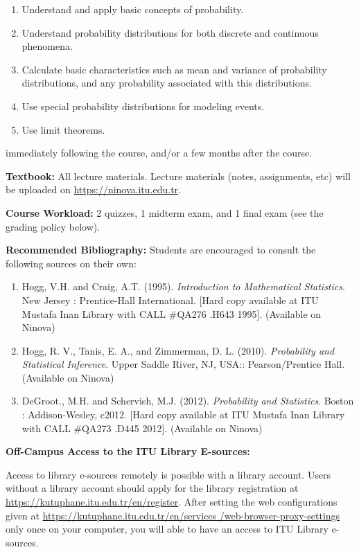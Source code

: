 \documentclass[
  12pt,
]{article}
\providecommand{\tightlist}{%
  \setlength{\itemsep}{0pt}\setlength{\parskip}{0pt}}
\begin{document}
\begin{enumerate}
\def\labelenumi{\arabic{enumi}.}
\tightlist
\item
  Understand and apply basic concepts of probability.
\item
  Understand probability distributions for both discrete and continuous
  phenomena.
\item
  Calculate basic characteristics such as mean and variance of
  probability distributions, and any probability associated with this
  distributions.
\item
  Use special probability distributions for modeling events.
\item
  Use limit theorems.
\end{enumerate}

immediately following the course, and/or a few months after the course.

\textbf{Textbook:} All lecture materials. Lecture materials (notes,
assignments, etc) will be uploaded on
\href{Ninova}{https://ninova.itu.edu.tr}.

\textbf{Course Workload:} 2 quizzes, 1 midterm exam, and 1 final exam
(see the grading policy below).

\textbf{Recommended Bibliography:} Students are encouraged to consult
the following sources on their own:

\begin{enumerate}
\def\labelenumi{\arabic{enumi}.}
\tightlist
\item
  Hogg, V.H. and Craig, A.T. (1995).
  \textit{Introduction to Mathematical Statistics}. New Jersey :
  Prentice-Hall International. {[}Hard copy available at ITU Mustafa
  Inan Library with CALL \#QA276 .H643 1995{]}. (Available on Ninova)
\item
  Hogg, R. V., Tanis, E. A., and Zimmerman, D. L. (2010).
  \textit{Probability and Statistical Inference}. Upper Saddle River,
  NJ, USA:: Pearson/Prentice Hall. (Available on Ninova)
\item
  DeGroot., M.H. and Schervish, M.J. (2012).
  \textit{Probability and Statistics}. Boston : Addison-Wesley, c2012.
  {[}Hard copy available at ITU Mustafa Inan Library with CALL \#QA273
  .D445 2012{]}. (Available on Ninova)
\end{enumerate}

\textbf{Off-Campus Access to the ITU Library E-sources:}

Access to library e-sources remotely is possible with a library account.
Users without a library account should apply for the library
registration at
\href{Library register}{https://kutuphane.itu.edu.tr/en/register}. After
setting the web configurations given at
\href{Proxy}{https://kutuphane.itu.edu.tr/en/services \linebreak /web-browser-proxy-settings}
only once on your computer, you will able to have an access to ITU
Library e-sources.
\end{document}
